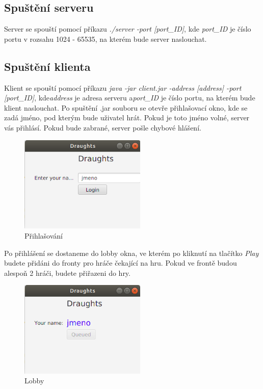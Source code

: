 \documentclass[12pt, a4paper]{article}
\begin{document}
\subsection{Spuštění serveru}
\label{Spuštění_serveru}
Server se spouští pomocí příkazu \textit{./server -port [port\_ID]}, kde \textit{port\_ID} je číslo portu v rozsahu 1024 - 65535, na kterém bude server naslouchat.
\subsection{Spuštění klienta}
\label{Spuštění_klienta}
Klient se spouští pomocí příkazu \textit{java -jar client.jar -address [address] -port [port\_ID]}, kde\textit{address} je adresa serveru a\textit{port\_ID} je číslo portu, na kterém bude klient naslouchat.
\newline
Po spuštění .jar souboru se otevře přihlašovací okno, kde se zadá jméno, pod kterým bude uživatel hrát. Pokud je toto jméno volné, server vás přihlásí. Pokud bude zabrané, server pošle chybové hlášení.
\begin {figure}[h]
\centering
\includegraphics[width=6cm]{img/login}
\caption{Přihlašování}
\label{fig:login}
\end {figure}
\newline
Po přihlášení se dostaneme do lobby okna, ve kterém po kliknutí na tlačítko \textit{Play} budete přidáni do fronty pro hráče čekající na hru. Pokud ve frontě budou alespoň 2 hráči, budete přiřazeni do hry.
\begin {figure}[h]
\centering
\includegraphics[width=6cm]{img/lobby}
\caption{Lobby}
\label{fig:lobby}
\end {figure}
\end{document}
